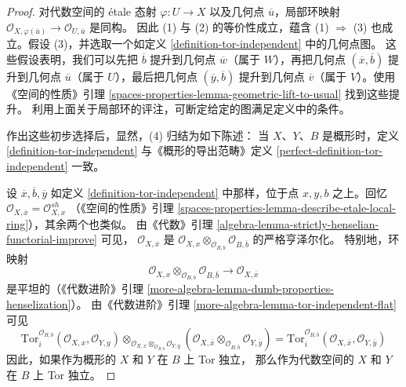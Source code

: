 \begin{proof}
对代数空间的 \'etale 态射 $\varphi : U \to X$ 以及几何点
$\overline{u}$，局部环映射
$\mathcal{O}_{X, \varphi(\overline{u})} \to
\mathcal{O}_{U, \overline{u}}$ 是同构。
因此 (1) 与 (2) 的等价性成立，蕴含 (1) $\Rightarrow$ (3)
也成立。假设 (3)，并选取一个如定义
\ref{definition-tor-independent} 中的几何点图。
这些假设表明，我们可以先把 $\overline{b}$ 提升到几何点
$\overline{w}$（属于 $W$），再把几何点
$(\overline{x}, \overline{b})$ 提升到几何点
$\overline{u}$（属于 $U$），最后把几何点
$(\overline{y}, \overline{b})$ 提升到几何点
$\overline{v}$（属于 $V$）。使用《空间的性质》引理
\ref{spaces-properties-lemma-geometric-lift-to-usual} 找到这些提升。
利用上面关于局部环的评注，可断定给定的图满足定义中的条件。

\medskip\noindent
作出这些初步选择后，显然，(4) 归结为如下陈述：
当 $X$、$Y$、$B$ 是概形时，定义
\ref{definition-tor-independent} 与《概形的导出范畴》定义
\ref{perfect-definition-tor-independent} 一致。

\medskip\noindent
设 $\overline{x}, \overline{b}, \overline{y}$ 如定义
\ref{definition-tor-independent} 中那样，位于点
$x, y, b$ 之上。回忆
$\mathcal{O}_{X, \overline{x}} = \mathcal{O}_{X, x}^{sh}$
（《空间的性质》引理
\ref{spaces-properties-lemma-describe-etale-local-ring}），其余两个也类似。
由《代数》引理
\ref{algebra-lemma-strictly-henselian-functorial-improve} 可见，
$\mathcal{O}_{X, \overline{x}}$ 是
$\mathcal{O}_{X, x} \otimes_{\mathcal{O}_{B, b}}
\mathcal{O}_{B, \overline{b}}$ 的严格亨泽尔化。
特别地，环映射
$$
\mathcal{O}_{X, x} \otimes_{\mathcal{O}_{B, b}} \mathcal{O}_{B, \overline{b}}
\longrightarrow
\mathcal{O}_{X, \overline{x}}
$$
是平坦的（《代数进阶》引理
\ref{more-algebra-lemma-dumb-properties-henselization}）。
由《代数进阶》引理
\ref{more-algebra-lemma-tor-independent-flat} 可见
$$
\text{Tor}_i^{\mathcal{O}_{B, b}}(\mathcal{O}_{X, x}, \mathcal{O}_{Y, y})
\otimes_{\mathcal{O}_{X, x} \otimes_{\mathcal{O}_{B, b}} \mathcal{O}_{Y, y}}
(\mathcal{O}_{X, \overline{x}} \otimes_{\mathcal{O}_{B, \overline{b}}}
\mathcal{O}_{Y, \overline y})
=
\text{Tor}_i^{\mathcal{O}_{B, \overline{b}}}(
\mathcal{O}_{X, \overline{x}}, \mathcal{O}_{Y, \overline{y}})
$$
因此，如果作为概形的 $X$ 和 $Y$ 在 $B$ 上 Tor 独立，
那么作为代数空间的 $X$ 和 $Y$ 在 $B$ 上 Tor 独立。


\end{proof}
